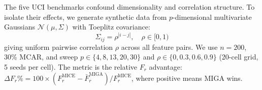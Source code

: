 The five UCI benchmarks confound dimensionality and correlation structure. To isolate their effects, we generate synthetic data from $p$-dimensional multivariate Gaussians $\mathcal{N}(\mu, \Sigma)$ with Toeplitz covariance:
\begin{equation}
    \Sigma_{ij} = \rho^{|i-j|}, \quad \rho \in [0, 1)
\end{equation}
giving uniform pairwise correlation $\rho$ across all feature pairs. We use $n = 200$, 30\% MCAR, and sweep $p \in \{4, 8, 13, 20, 30\}$ and $\rho \in \{0, 0.3, 0.6, 0.9\}$ (20-cell grid, 5 seeds per cell). The metric is the relative $F_r$ advantage: $\Delta F_r\% = 100 \times (F_r^{\text{MICE}} - \bar{F}_r^{\text{MIGA}}) / F_r^{\text{MICE}}$, where positive means MIGA wins.
